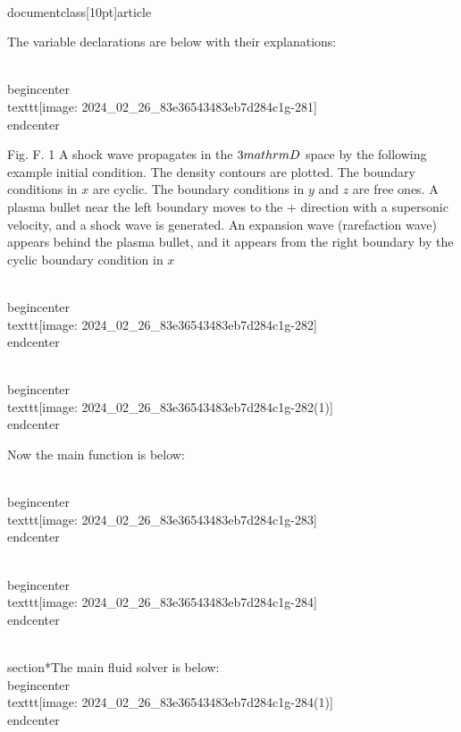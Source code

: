 \\documentclass[10pt]{article}
\begin{document}
{{{{{{The variable declarations are below with their explanations:

\\begin{center}
\\texttt{[image: 2024\_02\_26\_83e36543483eb7d284c1g-281]}
\\end{center}

Fig. F. 1 A shock wave propagates in the $3 \\mathrm{D}$ space by the following example initial condition. The density contours are plotted. The boundary conditions in $x$ are cyclic. The boundary conditions in $y$ and $z$ are free ones. A plasma bullet near the left boundary moves to the + direction with a supersonic velocity, and a shock wave is generated. An expansion wave (rarefaction wave) appears behind the plasma bullet, and it appears from the right boundary by the cyclic boundary condition in $x$

\\begin{center}
\\texttt{[image: 2024\_02\_26\_83e36543483eb7d284c1g-282]}
\\end{center}

\\begin{center}
\\texttt{[image: 2024\_02\_26\_83e36543483eb7d284c1g-282(1)]}
\\end{center}

Now the main function is below:

\\begin{center}
\\texttt{[image: 2024\_02\_26\_83e36543483eb7d284c1g-283]}
\\end{center}

\\begin{center}
\\texttt{[image: 2024\_02\_26\_83e36543483eb7d284c1g-284]}
\\end{center}

\\section*{The main fluid solver is below:}
\\begin{center}
\\texttt{[image: 2024\_02\_26\_83e36543483eb7d284c1g-284(1)]}
\\end{center}

}}}}}}
\end{document}
